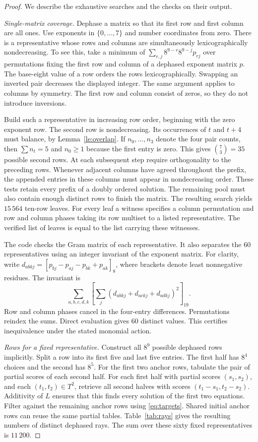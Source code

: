 \documentclass[11pt]{article}
\begin{document}
\begin{proof}
We describe the exhaustive searches and the checks on their output.

\emph{Single-matrix coverage.}
Dephase a matrix so that its first row and first column are all ones.
Use exponents in \(\{0,\ldots,7\}\) and number coordinates from zero.
There is a representative whose rows and columns are simultaneously
lexicographically nondecreasing. To see this, take a minimum of
\(\sum_{r,j}8^{9-r}8^{9-j}p_{rj}\) over permutations fixing the first
row and column of a dephased exponent matrix \(p\). The base-eight
value of a row orders the rows lexicographically. Swapping an inverted
pair decreases the displayed integer. The same argument applies to
columns by symmetry. The first row and column consist of zeros, so
they do not introduce inversions.

Build such a representative in increasing row order, beginning with
the zero exponent row. The second row is nondecreasing. Its occurrences
of \(t\) and \(t+4\) must balance, by Lemma~\ref{le:overlap}. If
\(n_0,\ldots,n_3\) denote the four pair counts, then
\(\sum n_t=5\) and \(n_0\ge1\) because the first entry is zero.
This gives \(\binom73=35\) possible second rows. At each subsequent
step require orthogonality to the preceding rows. Whenever adjacent
columns have agreed throughout the prefix, the appended entries in
these columns must appear in nondecreasing order. These tests retain
every prefix of a doubly ordered solution. The remaining pool must
also contain enough distinct rows to finish the matrix. The resulting
search yields \(15\,564\) ten-row leaves. For every leaf a witness
specifies a column permutation and row and column phases taking its row
multiset to a listed representative. The verified list of leaves is
equal to the list carrying these witnesses.

The code checks the Gram matrix of each representative. It also
separates the 60 representatives using an integer invariant of the
exponent matrix. For clarity, write
\(d_{abkj}=[p_{bj}-p_{aj}-p_{bk}+p_{ak}]_8\), where brackets denote
least nonnegative residues. The invariant is
\[
 \sum_{a,b,c,d,k}
 \left[\sum_j(d_{abkj}+d_{ackj}+d_{adkj})^2\right]_{19}.
\]
Row and column phases cancel in the four-entry differences. Permutations
reindex the sums. Direct evaluation gives 60 distinct values. This
certifies inequivalence under the stated monomial action.

\emph{Rows for a fixed representative.}
Construct all \(8^9\) possible dephased rows implicitly. Split a row
into its first five and last five entries. The first half has
\(8^4\) choices and the second has \(8^5\). For the first two
anchor rows, tabulate the pair of partial scores of each second half.
For each first half with partial scores \((s_1,s_2)\), and each
\((t_1,t_2)\in T^2\), retrieve all second halves with scores
\((t_1-s_1,t_2-s_2)\). Additivity of \(L\) ensures that this finds
every solution of the first two equations. Filter against the remaining
anchor rows using \eqref{eq:targets}. Shared initial anchor rows can
reuse the same partial tables. Table~\ref{tab:rays} gives the resulting
numbers of distinct dephased rays. The sum over these sixty fixed
representatives is \(11\,200\).


\end{proof}
\end{document}
